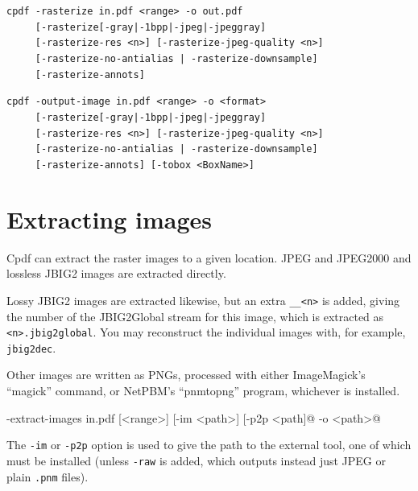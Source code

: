 \documentclass{book}
\begin{document}
\begin{framed}
\noindent\small\verb!cpdf -rasterize in.pdf <range> -o out.pdf!\\
\noindent\small\verb!     [-rasterize[-gray|-1bpp|-jpeg|-jpeggray]!\\
\noindent\small\verb!     [-rasterize-res <n>] [-rasterize-jpeg-quality <n>]!\\
\noindent\small\verb!     [-rasterize-no-antialias | -rasterize-downsample]!\\
\noindent\small\verb!     [-rasterize-annots]!

\vspace{1.5mm}

\noindent\small\verb!cpdf -output-image in.pdf <range> -o <format>!\\
\noindent\small\verb!     [-rasterize[-gray|-1bpp|-jpeg|-jpeggray]!\\
\noindent\small\verb!     [-rasterize-res <n>] [-rasterize-jpeg-quality <n>]!\\
\noindent\small\verb!     [-rasterize-no-antialias | -rasterize-downsample]!\\
\noindent\small\verb!     [-rasterize-annots] [-tobox <BoxName>]!

\end{framed}

\section{Extracting images}

Cpdf can extract the raster images to a given location. JPEG and JPEG2000 and lossless JBIG2 images are extracted directly.

Lossy JBIG2 images are extracted likewise, but an extra \texttt{\_\_<n>} is added, giving the number of the JBIG2Global stream for this image, which is extracted as \texttt{<n>.jbig2global}. You may reconstruct the individual images with, for example, \texttt{jbig2dec}.

Other images are written as PNGs, processed with either ImageMagick's ``magick'' command, or NetPBM's ``pnmtopng'' program, whichever is installed.

  \begin{framed}
  \noindent\small\verb@cpdf -extract-images in.pdf [<range>] [-im <path>] [-p2p <path]@
  \noindent\small{} -o <path>@
  \end{framed}

\noindent The \texttt{-im} or \texttt{-p2p} option is used to give the path to the external tool, one of which must be installed (unless \texttt{-raw} is added, which outputs instead just JPEG or plain \texttt{.pnm} files).
\end{document}
